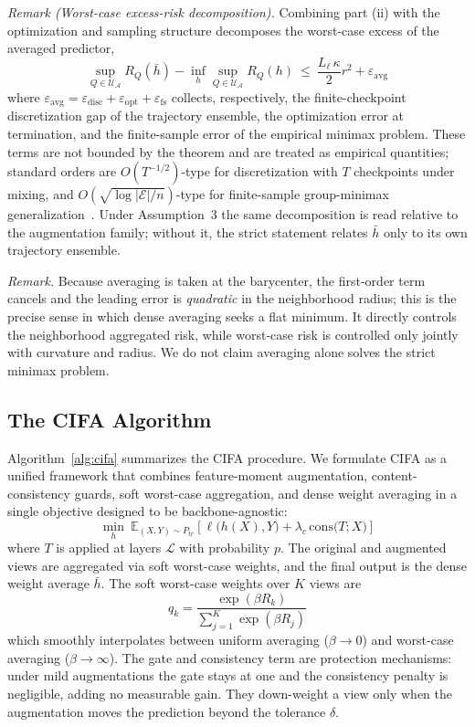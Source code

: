 \documentclass[electronics,article,submit,moreauthors]{Definitions/mdpi}
\begin{document}
\textit{Remark (Worst-case excess-risk decomposition).} Combining part (ii) with the optimization and sampling structure decomposes the worst-case excess of the averaged predictor,
\begin{equation}
\sup_{Q\in\mathcal{U}_{\mathcal{A}}}R_Q(\bar h)-\inf_h\sup_{Q\in\mathcal{U}_{\mathcal{A}}}R_Q(h)\ \leq\ \frac{L_\ell\,\kappa}{2}r^{2}+\varepsilon_{\mathrm{avg}}
\end{equation}
where $\varepsilon_{\mathrm{avg}}=\varepsilon_{\mathrm{disc}}+\varepsilon_{\mathrm{opt}}+\varepsilon_{\mathrm{fs}}$ collects, respectively, the finite-checkpoint discretization gap of the trajectory ensemble, the optimization error at termination, and the finite-sample error of the empirical minimax problem. These terms are not bounded by the theorem and are treated as empirical quantities; standard orders are $O(T^{-1/2})$-type for discretization with $T$ checkpoints under mixing, and $O(\sqrt{\log|\mathcal{E}|/n})$-type for finite-sample group-minimax generalization~\citep{ref10}. Under Assumption~3 the same decomposition is read relative to the augmentation family; without it, the strict statement relates $\bar h$ only to its own trajectory ensemble.

\textit{Remark.} Because averaging is taken at the barycenter, the first-order term cancels and the leading error is \emph{quadratic} in the neighborhood radius; this is the precise sense in which dense averaging seeks a flat minimum. It directly controls the neighborhood aggregated risk, while worst-case risk is controlled only jointly with curvature and radius. We do not claim averaging alone solves the strict minimax problem.

\subsection{The CIFA Algorithm}
\label{sec:algorithm}

Algorithm~\ref{alg:cifa} summarizes the CIFA procedure. We formulate CIFA as a unified framework that combines feature-moment augmentation, content-consistency guards, soft worst-case aggregation, and dense weight averaging in a single objective designed to be backbone-agnostic:
\begin{equation}
\min_h\ \mathbb{E}_{(X,Y)\sim P_{tr}}\!\left[\ell\big(h(X),Y\big)+\lambda_c\,\mathrm{cons}\big(T;X\big)\right]
\end{equation}
where $T$ is applied at layers $\mathcal{L}$ with probability $p$. The original and augmented views are aggregated via soft worst-case weights, and the final output is the dense weight average $\bar h$. The soft worst-case weights over $K$ views are
\begin{equation}
q_k=\frac{\exp(\beta R_k)}{\sum_{j=1}^{K}\exp(\beta R_j)}
\end{equation}
which smoothly interpolates between uniform averaging ($\beta\to 0$) and worst-case averaging ($\beta\to\infty$). The gate and consistency term are protection mechanisms: under mild augmentations the gate stays at one and the consistency penalty is negligible, adding no measurable gain. They down-weight a view only when the augmentation moves the prediction beyond the tolerance $\delta$.
\end{document}
